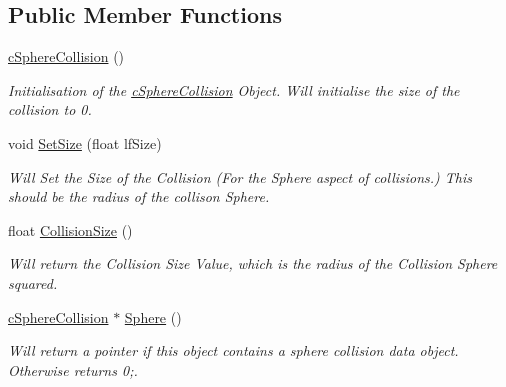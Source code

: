 \subsection*{Public Member Functions}
\begin{DoxyCompactItemize}
\item 
\hypertarget{classc_sphere_collision_a1bf8cc6c5c448614f770cd4e20490672}{
\hyperlink{classc_sphere_collision_a1bf8cc6c5c448614f770cd4e20490672}{cSphereCollision} ()}
\label{classc_sphere_collision_a1bf8cc6c5c448614f770cd4e20490672}

\begin{DoxyCompactList}\small\item\em Initialisation of the \hyperlink{classc_sphere_collision}{cSphereCollision} Object. Will initialise the size of the collision to 0. \end{DoxyCompactList}\item 
\hypertarget{classc_sphere_collision_ae4380fc994c031dbf950ab3dd9a95de7}{
void \hyperlink{classc_sphere_collision_ae4380fc994c031dbf950ab3dd9a95de7}{SetSize} (float lfSize)}
\label{classc_sphere_collision_ae4380fc994c031dbf950ab3dd9a95de7}

\begin{DoxyCompactList}\small\item\em Will Set the Size of the Collision (For the Sphere aspect of collisions.) This should be the radius of the collison Sphere. \end{DoxyCompactList}\item 
\hypertarget{classc_sphere_collision_aa06ac2f2047589d7d5d3b42500324dd5}{
float \hyperlink{classc_sphere_collision_aa06ac2f2047589d7d5d3b42500324dd5}{CollisionSize} ()}
\label{classc_sphere_collision_aa06ac2f2047589d7d5d3b42500324dd5}

\begin{DoxyCompactList}\small\item\em Will return the Collision Size Value, which is the radius of the Collision Sphere squared. \end{DoxyCompactList}\item 
\hypertarget{classc_sphere_collision_a901bc0b42bdb8acb82a9fad1dbee430a}{
\hyperlink{classc_sphere_collision}{cSphereCollision} $\ast$ \hyperlink{classc_sphere_collision_a901bc0b42bdb8acb82a9fad1dbee430a}{Sphere} ()}
\label{classc_sphere_collision_a901bc0b42bdb8acb82a9fad1dbee430a}

\begin{DoxyCompactList}\small\item\em Will return a pointer if this object contains a sphere collision data object. Otherwise returns 0;. \end{DoxyCompactList}\end{DoxyCompactItemize}



